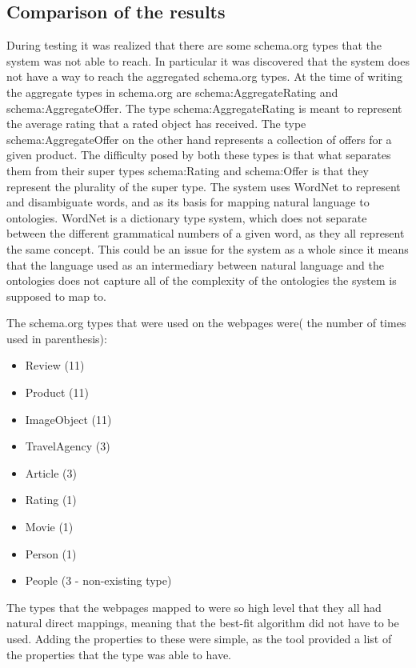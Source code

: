 \subsection{Comparison of the results}
During testing it was realized that there are some schema.org types that the system was not able to reach.
In particular it was discovered that the system does not have a way to reach the aggregated schema.org types.
At the time of writing the aggregate types in schema.org are schema:AggregateRating and schema:AggregateOffer.
The type schema:AggregateRating is meant to represent the average rating that a rated object has received.
The type schema:AggregateOffer on the other hand represents a collection of offers for a given product.
The difficulty posed by both these types is that what separates them from their super types schema:Rating and schema:Offer
is that they represent the plurality of the super type.
The system uses WordNet to represent and disambiguate words, and as its basis for mapping natural language to ontologies.
WordNet is a dictionary type system, which does not separate between the different grammatical numbers of a given word,
as they all represent the same concept.
This could be an issue for the system as a whole since it means that the language used as an intermediary between natural language
and the ontologies does not capture all of the complexity of the ontologies the system is supposed to map to.

The schema.org types that were used on the webpages were( the number of times used in parenthesis):

\begin{itemize}
	\item Review (11)
	\item Product (11)
	\item ImageObject (11)
	\item TravelAgency (3)
	\item Article (3)
	\item Rating (1)
	\item Movie (1)
	\item Person (1)
	\item People (3 - non-existing type)
\end{itemize}

The types that the webpages mapped to were so high level that they all had natural direct mappings,
meaning that the best-fit algorithm did not have to be used.
Adding the properties to these were simple,
as the tool provided a list of the properties that the type was able to have.

